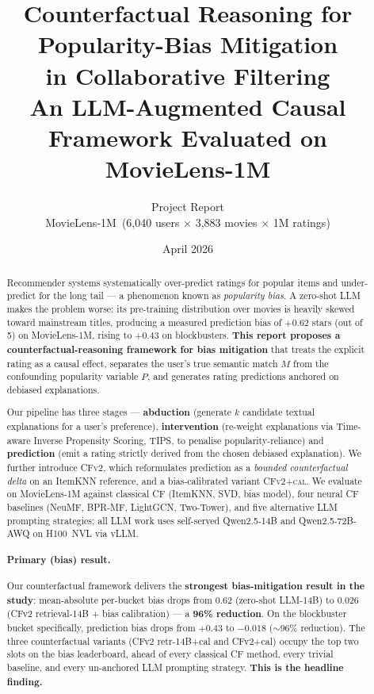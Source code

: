 \documentclass[11pt,a4paper]{article}
\title{
  \LARGE \textbf{Counterfactual Reasoning for Popularity-Bias Mitigation\\ in Collaborative Filtering}\\[4pt]
  \large An LLM-Augmented Causal Framework Evaluated on MovieLens-1M
}
\author{%
  Project Report \\[2pt]
  \small MovieLens-1M \,(6{,}040 users $\times$ 3{,}883 movies $\times$ 1M ratings)
}
\date{April 2026}
\newcommand{\best}[1]{\textcolor{goodgreen}{\textbf{#1}}}
\begin{document}
\maketitle
\thispagestyle{fancy}

\begin{abstract}
\noindent
Recommender systems systematically over-predict ratings for popular items
and under-predict for the long tail --- a phenomenon known as
\emph{popularity bias}. A zero-shot LLM makes the problem worse: its
pre-training distribution over movies is heavily skewed toward mainstream
titles, producing a measured prediction bias of $+0.62$ stars (out of 5)
on MovieLens-1M, rising to $+0.43$ on blockbusters. \textbf{This report
proposes a counterfactual-reasoning framework for bias mitigation} that
treats the explicit rating as a causal effect, separates the user's true
semantic match $M$ from the confounding popularity variable $P$, and
generates rating predictions anchored on debiased explanations.

Our pipeline has three stages --- \textbf{abduction} (generate $k$
candidate textual explanations for a user's preference), \textbf{intervention}
(re-weight explanations via Time-aware Inverse Propensity Scoring, TIPS, to
penalise popularity-reliance) and \textbf{prediction} (emit a rating
strictly derived from the chosen debiased explanation). We further
introduce \textsc{CFv2}, which reformulates prediction as a \emph{bounded
counterfactual delta} on an ItemKNN reference, and a bias-calibrated
variant \textsc{CFv2+cal}. We evaluate on MovieLens-1M against
classical CF (ItemKNN, SVD, bias model), four neural CF baselines (NeuMF,
BPR-MF, LightGCN, Two-Tower), and five alternative LLM prompting
strategies; all LLM work uses self-served Qwen2.5-14B and
Qwen2.5-72B-AWQ on H100~NVL via vLLM.

\paragraph{Primary (bias) result.} Our counterfactual framework delivers the
\textbf{strongest bias-mitigation result in the study}: mean-absolute
per-bucket bias drops from $0.62$ (zero-shot LLM-14B) to \best{$0.026$}
(CFv2 retrieval-14B $+$ bias calibration) --- a \textbf{96\% reduction}.
On the blockbuster bucket specifically, prediction bias drops from
$+0.43$ to $\mathbf{-0.018}$ ($\sim$96\% reduction). The three
counterfactual variants (CFv2 retr-14B+cal and CFv2+cal) occupy the top
two slots on the bias leaderboard, ahead of every classical CF method,
every trivial baseline, and every un-anchored LLM prompting strategy.
\textbf{This is the headline finding.}


\end{abstract}
\end{document}
